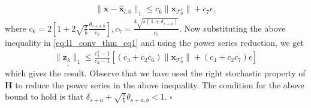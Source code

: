 \documentclass[journal]{IEEEtran}
\newcommand{\mbx}{\mathbf{x}}
\newcommand{\mbH}{\mathbf{H}}
\newcommand{\mbz}{\mathbf{z}}
\newcommand{\T}{\mathcal{T}}
\newcommand*{\QEDB}{\hfill\ensuremath{\square}}%
\begin{document}
\begin{eqnarray*}
\|\mbx-\hat{\mbx}_{l,0}\|_1 \leq c_6 \|\mbx_{\T_0^c}\| + c_7 \epsilon,
\end{eqnarray*}
where $c_6 = 2 \left[1 + 2 \sqrt{\frac{s}{b}} \frac{\theta_{s+a,b}}{c_5}\right], c_7 = \frac{4 \sqrt{s(1+\delta_{s+a})}}{c_5}$. Now substituting the above inequality in \eqref{eq:l1_conv_thm_eq1} and using the power series reduction, we get
\begin{eqnarray*}
\underline{\|\mbz_{k}\|_1} \leq \frac{c_2^k-1}{c_2-1}\left[(c_3+c_2c_6)\|\mbx_{\T_0^c}\| + (c_4+c_2c_7)\epsilon\right]
\end{eqnarray*}
which gives the result. Observe that we have used the right stochastic property of $\mbH$ to reduce the power series in the above inequality. The condition for the above bound to hold is that $\delta_{s+a}+\sqrt{\frac{s}{b}}\theta_{s+a,b} < 1$. \QEDB
\end{document}
